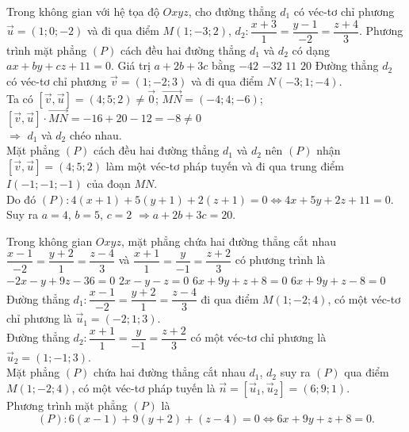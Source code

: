 \begin{ex}%
Trong không gian với hệ tọa độ $Oxyz$, cho đường thẳng $d_1$ có véc-tơ chỉ phương $\overrightarrow{u}=(1;0;-2)$ và đi qua điểm $M(1;-3;2)$, $d_2\colon\dfrac{x+3}{1}=\dfrac{y-1}{-2}=\dfrac{z+4}{3}$. Phương trình mặt phẳng $(P)$ cách đều hai đường thẳng $d_1$ và $d_2$ có dạng $ax+by+cz+11=0$. Giá trị $ a+2b+3c$ bằng
\choice
{$-42$}
{$-32$}
{$ 11$}
{\True $20$}
\loigiai
{
Đường thẳng $d_2$ có véc-tơ chỉ phương $\overrightarrow{v}=(1;-2;3)$ và đi qua điểm $ N(-3;1;-4)$.\\
Ta có $\left[\overrightarrow{v},\overrightarrow{u}\right]=(4;5;2)\ne\overrightarrow{0}$; $\overrightarrow{MN}=\left(-4;4;-6\right)$; $\left[\overrightarrow{v},\overrightarrow{u}\right]\cdot \overrightarrow{MN}=-16+20-12=-8\ne 0$\\
$\Rightarrow $ $d_1$ và $d_2$ chéo nhau.\\
Mặt phẳng $(P)$ cách đều hai đường thẳng $d_1$ và $d_2$ nên $(P)$ nhận $\left[\overrightarrow{v},\overrightarrow{u}\right]=(4;5;2)$ làm một véc-tơ pháp tuyến và đi qua trung điểm $ I(-1;-1;-1)$ của đoạn $ MN$.\\
Do đó $(P)\colon 4\left(x+1\right)+5\left(y+1\right)+2\left(z+1\right)=0\Leftrightarrow 4x+5y+2z+11=0$.\\
Suy ra $ a=4$, $b=5$, $c=2$ $\Rightarrow a+2b+3c=20$.}
\end{ex}

\begin{ex}%
Trong không gian $ Oxyz$, mặt phẳng chứa hai đường thẳng cắt nhau\break $\dfrac{x-1}{-2}=\dfrac{y+2}{1}=\dfrac{z-4}{3}$ và $\dfrac{x+1}{1}=\dfrac{y}{-1}=\dfrac{z+2}{3}$ có phương trình là
\choice
{$-2x-y+9z-36=0$}
{$ 2x-y-z=0$}
{\True $ 6x+9y+z+8=0$}
{$ 6x+9y+z-8=0$}
\loigiai
{
Đường thẳng $d_1\colon\dfrac{x-1}{-2}=\dfrac{y+2}{1}=\dfrac{z-4}{3}$ đi qua điểm $ M(1;-2;4)$, có một véc-tơ chỉ phương là $\overrightarrow{u}_1=(-2;1;3)$.\\
Đường thẳng $d_2\colon\dfrac{x+1}{1}=\dfrac{y}{-1}=\dfrac{z+2}{3}$ có một véc-tơ chỉ phương là $\overrightarrow{u}_2=(1;-1;3)$.\\
Mặt phẳng $(P)$ chứa hai đường thẳng cắt nhau $d_1$, $d_2$ suy ra $(P)$ qua điểm $ M(1;-2;4)$, có một véc-tơ pháp tuyến là $\overrightarrow{n}=\left[\overrightarrow{u}_1,\overrightarrow{u}_2\right]=(6;9;1)$.\\ Phương trình mặt phẳng $(P)$ là 
$$(P)\colon 6(x-1)+9(y+2)+(z-4)=0\Leftrightarrow 6x+9y+z+8=0.$$}
\end{ex}

